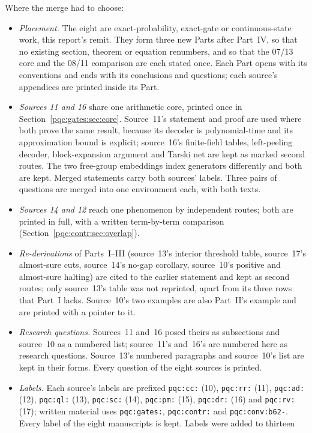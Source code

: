 \documentclass[11pt,letterpaper]{article}
\numberwithin{equation}{section}
\theoremstyle{definition}
\theoremstyle{remark}
\newcommand{\code}[1]{\nolinkurl{#1}}
\begin{document}
Where the merge had to choose:
\begin{itemize}
\item \emph{Placement.} The eight are exact-probability, exact-gate or
continuous-state work, this report's remit. They form three new Parts after
Part~IV, so that no existing section, theorem or equation renumbers, and so that
the 07/13 core and the 08/11 comparison are each stated once. Each Part opens
with its conventions and ends with its conclusions and questions; each source's
appendices are printed inside its Part.
\item \emph{Sources 11 and 16} share one arithmetic core, printed once in
Section~\ref{pqc:gates:sec:core}. Source~11's statement and proof are used where
both prove the same result, because its decoder is polynomial-time and its
approximation bound is explicit; source~16's finite-field tables, left-peeling
decoder, block-expansion argument and Tarski net are kept as marked second
routes. The two free-group embeddings index generators differently and both are
kept. Merged statements carry both sources' labels. Three pairs of questions
are merged into one environment each, with both texts.
\item \emph{Sources 14 and 12} reach one phenomenon by independent routes; both
are printed in full, with a written term-by-term comparison
(Section~\ref{pqc:contr:sec:overlap}).
\item \emph{Re-derivations} of Parts~I--III (source~13's interior threshold
table, source~17's almost-sure cuts, source~14's no-gap corollary, source~10's
positive and almost-sure halting) are cited to the earlier statement and kept as
second routes; only source~13's table was not reprinted, apart from its three
rows that Part~I lacks. Source~10's two examples are also Part~II's example and
are printed with a pointer to it.
\item \emph{Research questions.} Sources~11 and~16 posed theirs as subsections
and source~10 as a numbered list; source~11's and~16's are numbered here as
research questions. Source~13's numbered paragraphs and source~10's list are
kept in their forms. Every question of the eight sources is printed.
\item \emph{Labels.} Each source's labels are prefixed \code{pqc:cc:} (10),
\code{pqc:rr:} (11), \code{pqc:ad:} (12), \code{pqc:ql:} (13), \code{pqc:sc:}
(14), \code{pqc:pm:} (15), \code{pqc:dr:} (16) and \code{pqc:rv:} (17); written
material uses \code{pqc:gates:}, \code{pqc:contr:} and \code{pqc:conv:b62-}.
Every label of the eight manuscripts is kept. Labels were added to thirteen

\end{itemize}
\end{document}
